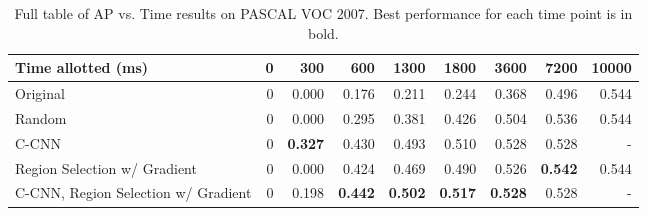 \begin{table}[ht]
\centering
\caption{
Full table of AP vs. Time results on PASCAL VOC 2007.
Best performance for each time point is in bold.
}\label{tab:results}
\small{
\begin{tabular}{lrrrrrrrr}
\toprule
Time allotted (ms)                  & 0 & 300            & 600            & 1300           & 1800           & 3600           & 7200           & 10000 \\
\midrule
Original                            & 0 & 0.000          & 0.176          & 0.211          & 0.244          & 0.368          & 0.496          & 0.544 \\
Random                              & 0 & 0.000          & 0.295          & 0.381          & 0.426          & 0.504          & 0.536          & 0.544 \\
C-CNN                               & 0 & \textbf{0.327} & 0.430          & 0.493          & 0.510          & 0.528          & 0.528          & - \\
Region Selection w/ Gradient        & 0 & 0.000          & 0.424          & 0.469          & 0.490          & 0.526          & \textbf{0.542} & 0.544 \\
C-CNN, Region Selection w/ Gradient & 0 & 0.198          & \textbf{0.442} & \textbf{0.502} & \textbf{0.517} & \textbf{0.528} & 0.528          & - \\
\bottomrule
\end{tabular}
}
\end{table}
